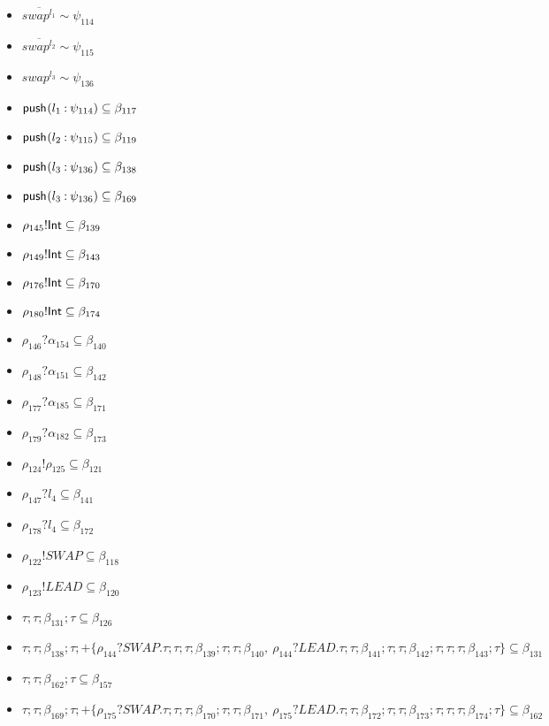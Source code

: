 \documentclass{article}
\begin{document}
\begin{itemize}
\item $ \overline{{swap}^{l_{1}}} \sim\psi_{114} $
\item $ \overline{{swap}^{l_{2}}} \sim\psi_{115} $
\item $ {swap}^{l_{3}} \sim\psi_{136} $
\item $ \textsf{push}_{}(  l_{1}\mathbin{:}\psi_{114} ) \subseteq \beta_{117} $
\item $ \textsf{push}_{}(  l_{2}\mathbin{:}\psi_{115} ) \subseteq \beta_{119} $
\item $ \textsf{push}_{}(  l_{3}\mathbin{:}\psi_{136} ) \subseteq \beta_{138} $
\item $ \textsf{push}_{}(  l_{3}\mathbin{:}\psi_{136} ) \subseteq \beta_{169} $
\item $ \rho_{145}!\textsf{Int} \subseteq \beta_{139} $
\item $ \rho_{149}!\textsf{Int} \subseteq \beta_{143} $
\item $ \rho_{176}!\textsf{Int} \subseteq \beta_{170} $
\item $ \rho_{180}!\textsf{Int} \subseteq \beta_{174} $
\item $ \rho_{146}?\alpha_{154} \subseteq \beta_{140} $
\item $ \rho_{148}?\alpha_{151} \subseteq \beta_{142} $
\item $ \rho_{177}?\alpha_{185} \subseteq \beta_{171} $
\item $ \rho_{179}?\alpha_{182} \subseteq \beta_{173} $
\item $ \rho_{124}!\rho_{125} \subseteq \beta_{121} $
\item $ \rho_{147}?l_{4} \subseteq \beta_{141} $
\item $ \rho_{178}?l_{4} \subseteq \beta_{172} $
\item $ \rho_{122}!SWAP \subseteq \beta_{118} $
\item $ \rho_{123}!LEAD \subseteq \beta_{120} $
\item $ \tau; \tau; \beta_{131}; \tau \subseteq \beta_{126} $
\item $ \tau; \tau; \beta_{138}; \tau; + \{\rho_{144}?SWAP.\tau; \tau; \tau; \beta_{139}; \tau; \tau; \beta_{140},~\rho_{144}?LEAD.\tau; \tau; \beta_{141}; \tau; \tau; \beta_{142}; \tau; \tau; \tau; \beta_{143}; \tau \} \subseteq \beta_{131} $
\item $ \tau; \tau; \beta_{162}; \tau \subseteq \beta_{157} $
\item $ \tau; \tau; \beta_{169}; \tau; + \{\rho_{175}?SWAP.\tau; \tau; \tau; \beta_{170}; \tau; \tau; \beta_{171},~\rho_{175}?LEAD.\tau; \tau; \beta_{172}; \tau; \tau; \beta_{173}; \tau; \tau; \tau; \beta_{174}; \tau \} \subseteq \beta_{162} $

\end{itemize}
\end{document}
